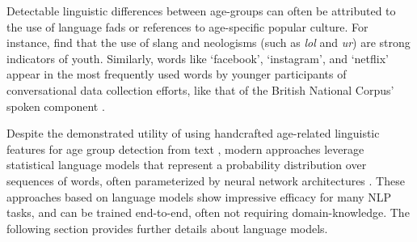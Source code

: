 Detectable linguistic differences between age-groups can often be attributed to the use of language fads or references to age-specific popular culture. For instance, \cite{schler2006effects} find that the use of slang and neologisms (such as \textit{lol} and \textit{ur}) are strong indicators of youth. Similarly, words like `facebook', `instagram', and `netflix' appear in the most frequently used words by younger participants of conversational data collection efforts, like that of the British National Corpus' spoken component \citep{love-spoken-bnc-2014}.

Despite the demonstrated utility of using handcrafted age-related linguistic features for age group detection from text \citep{schler2006effects}, modern approaches leverage statistical language models that represent a probability distribution over sequences of words, often parameterized by neural network architectures \citep{zheng2019personalized}. These approaches based on language models show impressive efficacy for many NLP tasks, and can be trained end-to-end, often not requiring domain-knowledge. The following section provides further details about language models.



